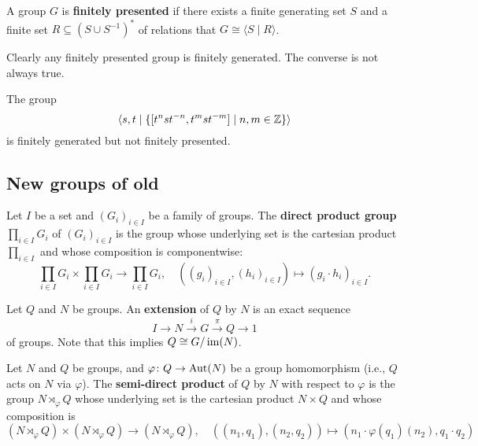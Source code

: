 \begin{definition}[]
    A group $G$ is \textbf{finitely presented}  if there exists a finite generating set $S$ and a finite set $R \subseteq (S \cup S^{-1}) ^*$ of relations that $G \cong \langle S \mid R \rangle $.
\end{definition}
Clearly any finitely presented group is finitely generated. The converse is not always true.
\begin{example}
   The group \[
       \langle s,t \mid \{[t ^n  s t ^{-n}, t^m s t ^{-m}] \mid  n,m \in \mathbb{Z}\}  \rangle 
   \]  is finitely generated but not finitely presented.
\end{example}

\subsection{New groups of old}
\begin{definition}[]
    Let $I$ be a set and $\left( G_i  \right) _{i \in I}$ be a family of groups. The \textbf{direct product group}  $\prod _{i \in I}G_i $ of $(G_i ) _{i \in I}$ is the group whose underlying set is the cartesian product $\prod _{i \in I}$ and whose composition is componentwise: \[
        \prod _{i \in I}G_i  \times \prod _{i \in I}G_i  \to  \prod _{i \in I}G_i ,\quad \left( \left( g_i  \right) _{i \in I}, \left( h_i  \right) _{i \in I} \right) \mapsto  \left( g_i  \cdot h_i  \right) _{i \in I}.
    \] 
\end{definition}
\begin{definition}[]
    Let $Q$ and $N$ be groups. An \textbf{extension} of $Q$ by $N$ is an exact sequence \[
    I \to N \xrightarrow iG \xrightarrow{\pi} Q \to 1
\] of groups. Note that this implies $Q \cong G / \operatorname{im}(N)$.
\end{definition}
\begin{definition}[]
    Let $N$ and $Q$ be groups, and $\varphi  \colon Q \to \mathrm{Aut}(N)$ be a group homomorphism (i.e., $Q$ acts on $N$ via $\varphi $). The \textbf{semi-direct product} of $Q$ by $N$ with respect to $\varphi $ is the group $N \rtimes_{\varphi }Q$ whose underlying set is the cartesian product $N \times Q$ and whose composition is  \[
        (N \rtimes _{\varphi }Q)\times (N \rtimes _{\varphi }Q) \to (N \rtimes _{\varphi }Q), \quad \left( \left( n_1,q_1 \right)  ,\left( n_2,q_2 \right) \right) \mapsto  (n_1 \cdot \varphi (q_1)(n_2), q_1 \cdot q_2)
    \] 
\end{definition}
